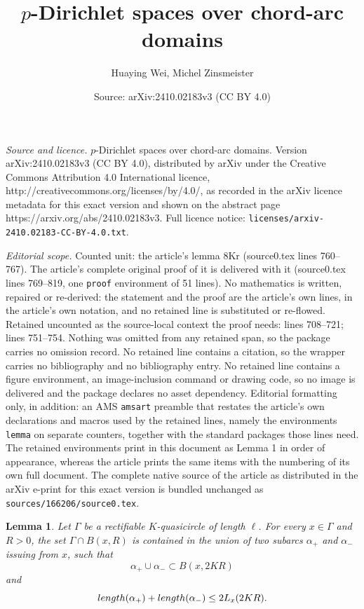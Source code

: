 \documentclass[10pt,a4paper]{amsart}
\title{$p$-Dirichlet spaces over chord-arc domains}
\author{Huaying Wei, Michel Zinsmeister}
\date{Source: arXiv:2410.02183v3 (CC BY 4.0)}
\newtheorem{lemma}{Lemma}
\begin{document}
\maketitle

\noindent\emph{Source and licence.} $p$-Dirichlet spaces over chord-arc domains. Version arXiv:2410.02183v3 (CC BY 4.0), distributed by arXiv under the Creative Commons Attribution 4.0 International licence, http://creativecommons.org/licenses/by/4.0/, as recorded in the arXiv licence metadata for this exact version and shown on the abstract page https://arxiv.org/abs/2410.02183v3. Full licence notice: \texttt{licenses/arxiv-2410.02183-CC-BY-4.0.txt}.\par\smallskip

\noindent\textit{Editorial scope.} Counted unit: the article's lemma 8Kr (source0.tex lines 760--767). The article's complete original proof of it is delivered with it (source0.tex lines 769--819, one \texttt{proof} environment of 51 lines). No mathematics is written, repaired or re-derived: the statement and the proof are the article's own lines, in the article's own notation, and no retained line is substituted or re-flowed.  Retained uncounted as the source-local context the proof needs: lines 708--721; lines 751--754.  Nothing was omitted from any retained span, so the package carries no omission record.  No retained line contains a citation, so the wrapper carries no bibliography and no bibliography entry.  No retained line contains a figure environment, an image-inclusion command or drawing code, so no image is delivered and the package declares no asset dependency.  Editorial formatting only, in addition: an AMS \texttt{amsart} preamble that restates the article's own declarations and macros used by the retained lines, namely the environments \texttt{lemma} on separate counters, together with the standard packages those lines need.  The retained environments print in this document as Lemma 1 in order of appearance, whereas the article prints the same items with the numbering of its own full document.  The complete native source of the article as distributed in the arXiv e-print for this exact version is bundled unchanged as \texttt{sources/166206/source0.tex}.
\begin{lemma}\label{2arc}
Let $\Gamma$ be a rectifiable $K$-quasicircle of length $\ell$.  For
every $x\in\Gamma$ and $R>0$, the set $\Gamma\cap B(x,R)$ is contained in
the union of two 
subarcs $\alpha_+$ and $\alpha_-$ issuing from $x$, such that
\[
  \alpha_+\cup\alpha_-\subset B(x,2KR)
\]
and
\begin{equation}\label{alph}
  {\rm length}(\alpha_+)+{\rm length}(\alpha_-)
  \le2L_x(2KR).
\end{equation}
\end{lemma}
\end{document}
